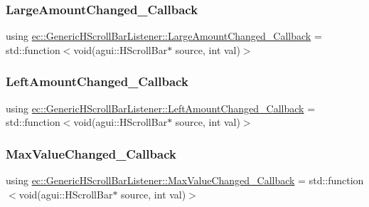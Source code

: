\subsubsection{\texorpdfstring{Large\+Amount\+Changed\+\_\+\+Callback}{LargeAmountChanged\_Callback}}
{\footnotesize\ttfamily using \mbox{\hyperlink{classec_1_1_generic_h_scroll_bar_listener_a668ece57152ae7212f4e7b68a202da04}{ec\+::\+Generic\+H\+Scroll\+Bar\+Listener\+::\+Large\+Amount\+Changed\+\_\+\+Callback}} =  std\+::function$<$void(agui\+::\+H\+Scroll\+Bar$\ast$ source, int val)$>$}

\mbox{\label{classec_1_1_generic_h_scroll_bar_listener_ab6d93e64747e807550ab74972a06a608}} 
\subsubsection{\texorpdfstring{Left\+Amount\+Changed\+\_\+\+Callback}{LeftAmountChanged\_Callback}}
{\footnotesize\ttfamily using \mbox{\hyperlink{classec_1_1_generic_h_scroll_bar_listener_ab6d93e64747e807550ab74972a06a608}{ec\+::\+Generic\+H\+Scroll\+Bar\+Listener\+::\+Left\+Amount\+Changed\+\_\+\+Callback}} =  std\+::function$<$void(agui\+::\+H\+Scroll\+Bar$\ast$ source, int val)$>$}

\mbox{\label{classec_1_1_generic_h_scroll_bar_listener_a477535313b5feb1040874b1c0c9c9d1f}} 
\subsubsection{\texorpdfstring{Max\+Value\+Changed\+\_\+\+Callback}{MaxValueChanged\_Callback}}
{\footnotesize\ttfamily using \mbox{\hyperlink{classec_1_1_generic_h_scroll_bar_listener_a477535313b5feb1040874b1c0c9c9d1f}{ec\+::\+Generic\+H\+Scroll\+Bar\+Listener\+::\+Max\+Value\+Changed\+\_\+\+Callback}} =  std\+::function$<$void(agui\+::\+H\+Scroll\+Bar$\ast$ source, int val)$>$}

